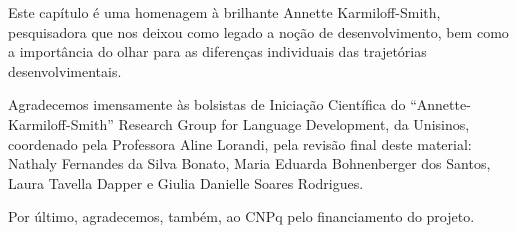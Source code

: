 \documentclass[output=paper,colorlinks,citecolor=brown,booklanguage=portuguese]{langscibook}
\begin{document}
Este capítulo é uma homenagem à brilhante Annette Karmiloff-Smith, pesquisadora que nos deixou como legado a noção de desenvolvimento, bem como a importância do olhar para as diferenças individuais das trajetórias desenvolvimentais. 

Agradecemos imensamente às bolsistas de Iniciação Científica do “Annette-Karmiloff-Smith” Research Group for Language Development, da Unisinos, coordenado pela Professora Aline Lorandi, pela revisão final deste material: Nathaly Fernandes da Silva Bonato, Maria Eduarda Bohnenberger dos Santos, Laura Tavella Dapper e Giulia Danielle Soares Rodrigues.
 
Por último, agradecemos, também, ao CNPq pelo financiamento do projeto.



{\sloppy\printbibliography[heading=subbibliography,notkeyword=this]}
\end{document}

